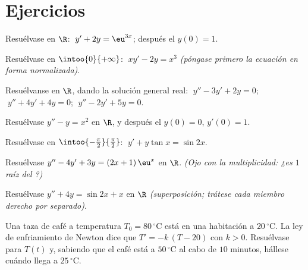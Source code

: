 \section{Ejercicios}

\begin{exercise}[$\star$]\label{exo:b1:diffeq:1}
Resuélvase en $\R$: $\;y' + 2y = \eu^{3x}$; después el
 $y(0) = 1$.
\end{exercise}

\begin{exercise}[$\star$]\label{exo:b1:diffeq:2}
Resuélvase en $\intoo{0}{+\infty}$: $\;x y' - 2y = x^3$
\emph{(póngase primero la ecuación en forma normalizada)}.
\end{exercise}

\begin{exercise}[$\star$]\label{exo:b1:diffeq:3}
Resuélvanse en $\R$, dando la solución general real:
$\;y'' - 3y' + 2y = 0$; $\;y'' + 4y' + 4y = 0$; $\;y'' - 2y' + 5y =
0$.
\end{exercise}

\begin{exercise}[$\star$]\label{exo:b1:diffeq:4}
Resuélvase $y'' - y = x^2$ en $\R$, y después el
 $y(0) = 0$, $y'(0) = 1$.
\end{exercise}

\begin{exercise}[$\star\star$]\label{exo:b1:diffeq:5}
Resuélvase en $\intoo{-\frac\pi2}{\frac\pi2}$:
$\;y' + y\tan x = \sin 2x$.
\end{exercise}

\begin{exercise}[$\star\star$]\label{exo:b1:diffeq:6}
Resuélvase $y'' - 4y' + 3y = (2x + 1)\,\eu^{x}$ en $\R$. \emph{(Ojo con
la multiplicidad: ¿es $1$ raíz del ?)}
\end{exercise}

\begin{exercise}[$\star\star$]\label{exo:b1:diffeq:7}
Resuélvase $y'' + 4y = \sin 2x + x$ en $\R$ \emph{(superposición;
trátese cada miembro derecho por separado)}.
\end{exercise}

\begin{exercise}[$\star\star$]\label{exo:b1:diffeq:8}
Una taza de café a temperatura $T_0 = 80\,^\circ$C está en una
habitación a $20\,^\circ$C. La ley de enfriamiento de Newton dice que
$T' = -k\,(T - 20)$ con $k > 0$. Resuélvase para $T(t)$ y, sabiendo que
el café está a $50\,^\circ$C al cabo de $10$ minutos, hállese cuándo
llega a $25\,^\circ$C.
\end{exercise}

